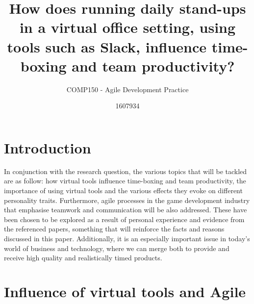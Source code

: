 \documentclass{scrartcl}
\title{How does running daily stand-ups in a virtual office setting, using tools such as Slack, influence time-boxing and team productivity?}
\subtitle{COMP150 - Agile Development Practice}
\author{1607934}
\begin{document}
\maketitle


\section{Introduction}

In conjunction with the research question, the various topics that will be tackled are as follow: how virtual tools influence time-boxing and team productivity, the importance of using virtual tools and the various effects they evoke on different personality traits. Furthermore, agile processes in the game development industry that emphasise teamwork and communication will be also addressed. These have been chosen to be explored as a result of personal experience and evidence from the referenced papers, something that will reinforce the facts and reasons discussed in this paper. Additionally, it is an especially important issue in today's world of business and technology, where we can merge both to provide and receive high quality and realistically timed products. 


\section{Influence of virtual tools and Agile}
\end{document}
